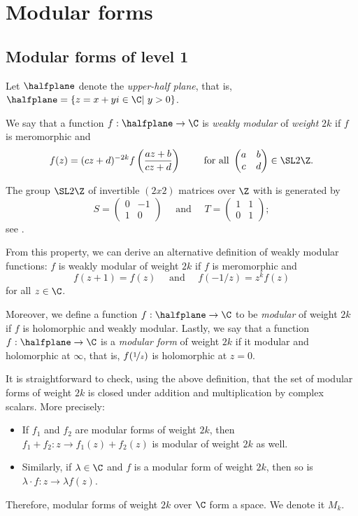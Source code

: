\section{Modular forms}
\subsection{Modular forms of level 1}
Let $\halfplane$ denote the \textit{upper-half plane}, that is, $\halfplane = \{z = x+yi \in \C | \ y>0 \}$.

We say that a function $f:\halfplane \to \C$ is \textit{weakly modular} of \textit{weight} $2k$ if $f$ is meromorphic and
$$
f(z) = (cz+d)^{-2k} f \left( \frac{az+b}{cz+d} \right)
\qquad \text{ for all }
\begin{pmatrix} a & b\\
				c & d
\end{pmatrix}
\in \SL2{\Z}.
$$

The group $\SL2{\Z}$ of invertible $(2x2)$ matrices over $\Z$ with  is generated by
$$
S = \begin{pmatrix} 0 & -1 \\
					1 &  0
\end{pmatrix}
\quad \text{ and } \quad
T = \begin{pmatrix} 1 & 1 \\
					0 & 1 
\end{pmatrix};
$$
see \cite[p.1-2]{SL2Z}.

From this property, we can derive an alternative definition of weakly modular functions:
$f$ is weakly modular of weight $2k$ if $f$ is meromorphic and
$$
f(z+1) = f(z) \quad \text{ and } \quad f(-1/z) = z^k f(z)
$$
for all $z \in \C$.

Moreover, we define a function $f:\halfplane \to \C$ to be \textit{modular} of weight $2k$ if $f$ is holomorphic and weakly modular.
Lastly, we say that a function $f:\halfplane \to \C$ is a \textit{modular form} of weight $2k$ if it modular and holomorphic at $\infty$, that is, $f(\nicefrac{1}{z})$ is holomorphic at $z=0$.

It is straightforward to check, using the above definition, that the set of modular forms of weight $2k$ is closed under addition and multiplication by complex scalars.
More precisely:
\begin{itemize}
    \item If $f_1$ and $f_2$ are modular forms of weight $2k$, then $f_1+f_2: z \to f_1(z)+f_2(z)$ is modular of weight $2k$ as well.
    
    \item Similarly, if $\lambda \in \C$ and $f$ is a modular form of weight $2k$, then so is $\lambda \cdot f: z \to \lambda f(z)$.
\end{itemize}
Therefore, modular forms of weight $2k$ over $\C$ form a space. We denote it $M_k$.

